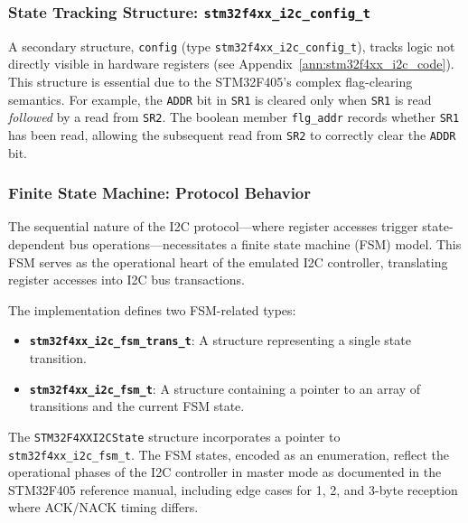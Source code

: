 \subsubsection{State Tracking Structure: \texttt{stm32f4xx\_i2c\_config\_t}}

A secondary structure, \texttt{config} (type \texttt{stm32f4xx\_i2c\_config\_t}), 
tracks logic not directly visible in hardware registers (see Appendix~\ref{ann:stm32f4xx_i2c_code}). 
This structure is essential due to the STM32F405's complex flag-clearing semantics. 
For example, the \texttt{ADDR} bit in \texttt{SR1} is cleared only when \texttt{SR1} 
is read \emph{followed} by a read from \texttt{SR2}. The boolean member 
\texttt{flg\_addr} records whether \texttt{SR1} has been read, allowing the subsequent 
read from \texttt{SR2} to correctly clear the \texttt{ADDR} bit.

\subsubsection{Finite State Machine: Protocol Behavior}

The sequential nature of the I2C protocol---where register accesses trigger 
state-dependent bus operations---necessitates a finite state machine (FSM) model. 
This FSM serves as the operational heart of the emulated I2C controller, translating 
register accesses into I2C bus transactions.

The implementation defines two FSM-related types:

\begin{itemize}
    \item \textbf{\texttt{stm32f4xx\_i2c\_fsm\_trans\_t}}: A structure representing 
    a single state transition.
    
    \item \textbf{\texttt{stm32f4xx\_i2c\_fsm\_t}}: A structure containing a pointer 
    to an array of transitions and the current FSM state.
\end{itemize}

The \texttt{STM32F4XXI2CState} structure incorporates a pointer to 
\texttt{stm32f4xx\_i2c\_fsm\_t}. The FSM states, encoded as an enumeration, reflect 
the operational phases of the I2C controller in master mode as documented in the 
STM32F405 reference manual, including edge cases for 1, 2, and 3-byte reception where 
ACK/NACK timing differs.

